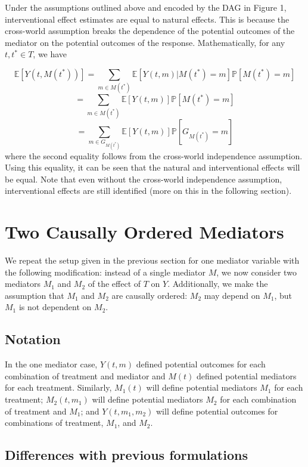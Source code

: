 \documentclass[12pt]{article} %
\numberwithin{equation}{section} %
\begin{document}
Under the assumptions outlined above and encoded by the DAG in Figure 1, interventional effect estimates are equal to natural effects. This is because the cross-world assumption breaks the dependence of the potential outcomes of the mediator on the potential outcomes of the response. Mathematically, for any $t,t^{*} \in T$, we have

$$\mathbb{E}[Y(t,M(t^*))] = \sum_{m \in M(t^*)}\mathbb{E}[Y(t,m)|M(t^*)=m]\mathbb{P}[M(t^*)=m]$$
$$= \sum_{m \in M(t^*)}\mathbb{E}[Y(t,m)]\mathbb{P}[M(t^*)=m]$$
$$= \sum_{m \in G_{M(t^{*})}}\mathbb{E}[Y(t,m)]\mathbb{P}[G_{M(t^*)}=m]$$
where the second equality follows from the cross-world independence assumption. Using this equality, it can be seen that the natural and interventional effects will be equal. Note that even without the cross-world independence assumption, interventional effects are still identified (more on this in the following section). 

\section{Two Causally Ordered Mediators}
\label{sec:two_mediators}

We repeat the setup given in the previous section for one mediator variable with the following modification: instead of a single mediator $M$, we now consider two mediators $M_{1}$ and $M_{2}$ of the effect of $T$ on $Y$. Additionally, we make the assumption that $M_{1}$ and $M_{2}$ are causally ordered: $M_{2}$ may depend on $M_{1}$, but $M_{1}$ is not dependent on $M_{2}$. 

\subsection{Notation}
In the one mediator case, $Y(t,m)$ defined potential outcomes for each combination of treatment and mediator and $M(t)$ defined potential mediators for each treatment. Similarly, $M_{1}(t)$ will define potential mediators $M_{1}$ for each treatment; $M_{2}(t,m_{1})$ will define potential mediators $M_{2}$ for each combination of treatment and $M_{1}$; and $Y(t,m_{1},m_{2})$ will define potential outcomes for combinations of treatment, $M_{1}$, and $M_{2}$. 

\subsection{Differences with previous formulations}
\end{document}
